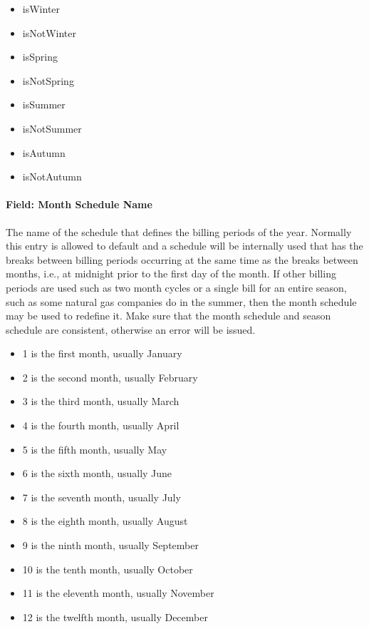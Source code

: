 \begin{itemize}
\item
  isWinter
\item
  isNotWinter
\item
  isSpring
\item
  isNotSpring
\item
  isSummer
\item
  isNotSummer
\item
  isAutumn
\item
  isNotAutumn
\end{itemize}

\paragraph{Field: Month Schedule Name}\label{field-month-schedule-name}

The name of the schedule that defines the billing periods of the year. Normally this entry is allowed to default and a schedule will be internally used that has the breaks between billing periods occurring at the same time as the breaks between months, i.e., at midnight prior to the first day of the month. If other billing periods are used such as two month cycles or a single bill for an entire season, such as some natural gas companies do in the summer, then the month schedule may be used to redefine it. Make sure that the month schedule and season schedule are consistent, otherwise an error will be issued.

\begin{itemize}
\item
  1 is the first month, usually January
\item
  2 is the second month, usually February
\item
  3 is the third month, usually March
\item
  4 is the fourth month, usually April
\item
  5 is the fifth month, usually May
\item
  6 is the sixth month, usually June
\item
  7 is the seventh month, usually July
\item
  8 is the eighth month, usually August
\item
  9 is the ninth month, usually September
\item
  10 is the tenth month, usually October
\item
  11 is the eleventh month, usually November
\item
  12 is the twelfth month, usually December
\end{itemize}


